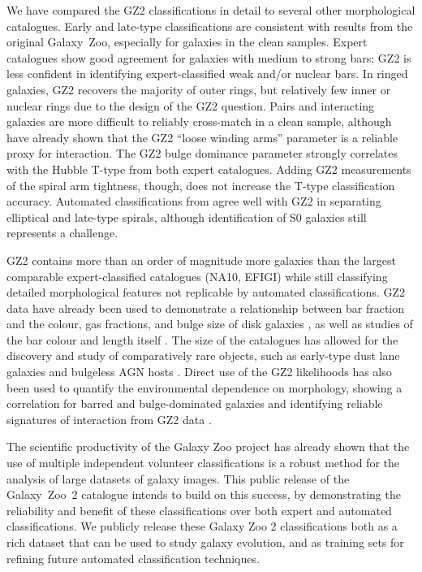 \documentclass[useAMS,usenatbib]{mn2e}
\begin{document}
We have compared the GZ2 classifications in detail to several other morphological catalogues. Early and late-type classifications are consistent with results from the original Galaxy~Zoo, especially for galaxies in the clean samples. Expert catalogues \citep{nai10,bai11} show good agreement for galaxies with medium to strong bars; GZ2 is less confident in identifying expert-classified weak and/or nuclear bars. In ringed galaxies, GZ2 recovers the majority of outer rings, but relatively few inner or nuclear rings due to the design of the GZ2 question. Pairs and interacting galaxies are more difficult to reliably cross-match in a clean sample, although \citet{cas13} have already shown that the GZ2 ``loose winding arms'' parameter is a reliable proxy for interaction. The GZ2 bulge dominance parameter strongly correlates with the Hubble T-type from both expert catalogues. Adding GZ2 measurements of the spiral arm tightness, though, does not increase the T-type classification accuracy. Automated classifications from \citet{hue11} agree well with GZ2 in separating elliptical and late-type spirals, although identification of S0 galaxies still represents a challenge. 

GZ2 contains more than an order of magnitude more galaxies than the largest comparable expert-classified catalogues (NA10, EFIGI) while still classifying detailed morphological features not replicable by automated classifications. GZ2 data have already been used to demonstrate a relationship between bar fraction and the colour, gas fractions, and bulge size of disk galaxies \citep{mas11c,mas12a}, as well as studies of the bar colour and length itself \citep{hoy11}. The size of the catalogues has allowed for the discovery and study of comparatively rare objects, such as early-type dust lane galaxies \citep{kav12a} and bulgeless AGN hosts \citep{sim13}. Direct use of the GZ2 likelihoods has also been used to quantify the environmental dependence on morphology, showing a correlation for barred and bulge-dominated galaxies \citep{ski12} and identifying reliable signatures of interaction from GZ2 data \citep{cas13}. 

The scientific productivity of the Galaxy Zoo project has already shown that the use of multiple independent volunteer classifications is a robust method for the analysis of large datasets of galaxy images. This public release of the Galaxy~Zoo~2 catalogue intends to build on this success, by demonstrating the reliability and benefit of these classifications over both expert and automated classifications. We publicly release these Galaxy Zoo 2 classifications both as a rich dataset that can be used to study galaxy evolution, and as training sets for refining future automated classification techniques.
\end{document}
